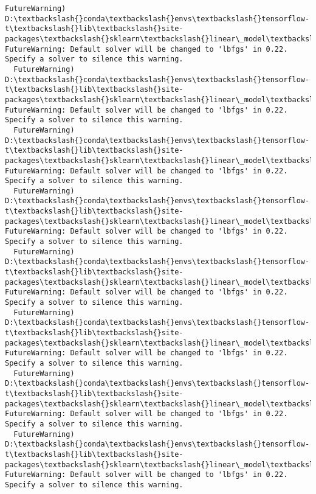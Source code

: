 \documentclass[11pt]{article}
\begin{document}
\begin{Verbatim}[commandchars=\\\{\}]
  FutureWarning)
D:\textbackslash{}conda\textbackslash{}envs\textbackslash{}tensorflow-t\textbackslash{}lib\textbackslash{}site-packages\textbackslash{}sklearn\textbackslash{}linear\_model\textbackslash{}logistic.py:433: FutureWarning: Default solver will be changed to 'lbfgs' in 0.22. Specify a solver to silence this warning.
  FutureWarning)
D:\textbackslash{}conda\textbackslash{}envs\textbackslash{}tensorflow-t\textbackslash{}lib\textbackslash{}site-packages\textbackslash{}sklearn\textbackslash{}linear\_model\textbackslash{}logistic.py:433: FutureWarning: Default solver will be changed to 'lbfgs' in 0.22. Specify a solver to silence this warning.
  FutureWarning)
D:\textbackslash{}conda\textbackslash{}envs\textbackslash{}tensorflow-t\textbackslash{}lib\textbackslash{}site-packages\textbackslash{}sklearn\textbackslash{}linear\_model\textbackslash{}logistic.py:433: FutureWarning: Default solver will be changed to 'lbfgs' in 0.22. Specify a solver to silence this warning.
  FutureWarning)
D:\textbackslash{}conda\textbackslash{}envs\textbackslash{}tensorflow-t\textbackslash{}lib\textbackslash{}site-packages\textbackslash{}sklearn\textbackslash{}linear\_model\textbackslash{}logistic.py:433: FutureWarning: Default solver will be changed to 'lbfgs' in 0.22. Specify a solver to silence this warning.
  FutureWarning)
D:\textbackslash{}conda\textbackslash{}envs\textbackslash{}tensorflow-t\textbackslash{}lib\textbackslash{}site-packages\textbackslash{}sklearn\textbackslash{}linear\_model\textbackslash{}logistic.py:433: FutureWarning: Default solver will be changed to 'lbfgs' in 0.22. Specify a solver to silence this warning.
  FutureWarning)
D:\textbackslash{}conda\textbackslash{}envs\textbackslash{}tensorflow-t\textbackslash{}lib\textbackslash{}site-packages\textbackslash{}sklearn\textbackslash{}linear\_model\textbackslash{}logistic.py:433: FutureWarning: Default solver will be changed to 'lbfgs' in 0.22. Specify a solver to silence this warning.
  FutureWarning)
D:\textbackslash{}conda\textbackslash{}envs\textbackslash{}tensorflow-t\textbackslash{}lib\textbackslash{}site-packages\textbackslash{}sklearn\textbackslash{}linear\_model\textbackslash{}logistic.py:433: FutureWarning: Default solver will be changed to 'lbfgs' in 0.22. Specify a solver to silence this warning.
  FutureWarning)
D:\textbackslash{}conda\textbackslash{}envs\textbackslash{}tensorflow-t\textbackslash{}lib\textbackslash{}site-packages\textbackslash{}sklearn\textbackslash{}linear\_model\textbackslash{}logistic.py:433: FutureWarning: Default solver will be changed to 'lbfgs' in 0.22. Specify a solver to silence this warning.

\end{Verbatim}
\end{document}

